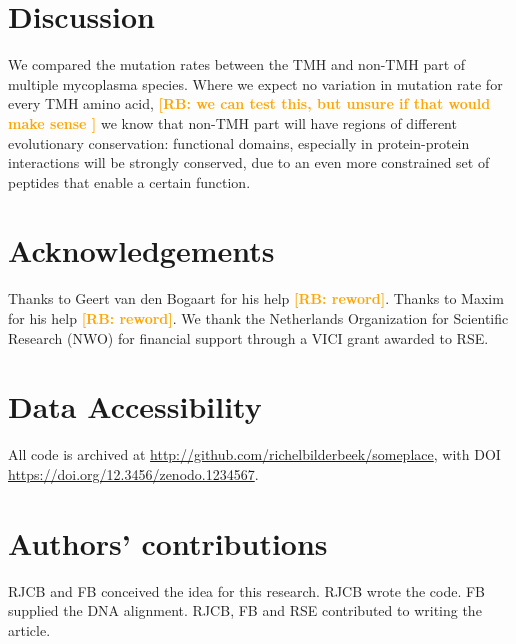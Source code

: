 \documentclass{article}
\newcommand{\richel}[1]{\textcolor{orange}{\textbf{[RB: #1]}}}
\begin{document}
\section{Discussion}

We compared the mutation rates between the TMH and non-TMH part of
multiple mycoplasma species. Where we expect no variation 
in mutation rate for every TMH amino acid,
\richel{
  we can test this, but unsure if that would make sense
}
we know that non-TMH part will have regions of different evolutionary
conservation: functional domains, especially in protein-protein
interactions will be strongly conserved, due to an even more constrained
set of peptides that enable a certain function.


\section{Acknowledgements}

Thanks to Geert van den Bogaart for his help \richel{reword}.
Thanks to Maxim for his help \richel{reword}.
We thank the Netherlands 
Organization for Scientific Research (NWO) for financial support 
through a VICI grant awarded to RSE.

\section{Data Accessibility}

All code is archived at \url{http://github.com/richelbilderbeek/someplace},
with DOI \url{https://doi.org/12.3456/zenodo.1234567}.

\section{Authors' contributions}

RJCB and FB conceived the idea for this research. 
RJCB wrote the code.
FB supplied the DNA alignment.
RJCB, FB and RSE contributed to writing the article.
\end{document}
